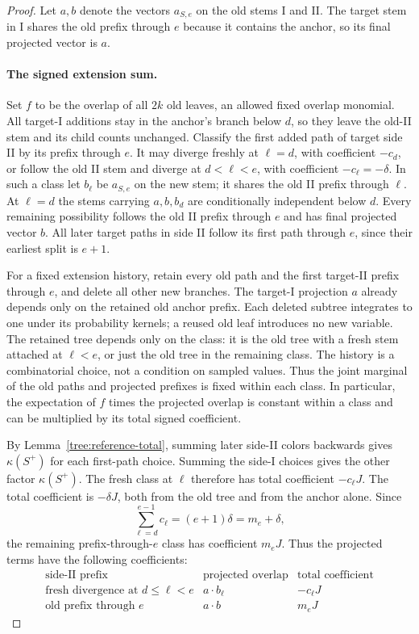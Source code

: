 \begin{proof}
Let $a,b$ denote the vectors $a_{S,e}$ on the old stems I and II.
The target stem in I shares the old prefix through $e$ because it
contains the anchor, so its final projected vector is $a$.

\paragraph{The signed extension sum.}
Set $f$ to be the overlap of all $2k$ old leaves, an allowed fixed
overlap monomial. All target-I additions stay in the anchor's branch
below $d$, so they leave the old-II stem and its child counts unchanged.
Classify the first added path of target side II by its prefix
through $e$.  It may diverge freshly at $\ell=d$, with coefficient
$-c_d$, or follow the old II stem and diverge at $d<\ell<e$, with
coefficient $-c_\ell=-\delta$.  In such a class let $b_\ell$ be
$a_{S,e}$ on the new stem; it shares the old II prefix through
$\ell$.  At $\ell=d$ the stems carrying $a,b,b_d$ are conditionally
independent below $d$.  Every remaining possibility follows the
old II prefix through $e$ and has final projected vector $b$.
All later target paths in side II follow its first path through
$e$, since their earliest split is $e+1$.

For a fixed extension history, retain every old path and the first
target-II prefix through $e$, and delete all other new branches.
The target-I projection $a$ already depends only on the retained old
anchor prefix. Each deleted subtree integrates to one under its
probability kernels; a reused old leaf introduces no new variable.
The retained tree depends only on the class: it is the old tree with a
fresh stem attached at $\ell<e$, or just the old tree in the remaining
class. The history is a combinatorial choice, not a condition on sampled
values. Thus the joint marginal of the old paths and projected prefixes
is fixed within each class. In particular, the expectation of $f$ times
the projected overlap is constant within a class and can be multiplied
by its total signed coefficient.

By Lemma~\ref{tree:reference-total}, summing later side-II colors
backwards gives $\kappa(S^+)$ for each first-path choice.  Summing the
side-I choices gives the other factor $\kappa(S^+)$. The fresh class
at $\ell$ therefore has total coefficient $-c_\ell J$.
The total coefficient is $-\delta J$, both from the old tree and
from the anchor alone. Since
\[
 \sum_{\ell=d}^{e-1}c_\ell=(e+1)\delta=m_e+\delta,
\]
the remaining prefix-through-$e$ class has coefficient $m_eJ$.
Thus the projected terms have the following coefficients:
\[
 \begin{array}{c|c|c}
 \text{side-II prefix} & \text{projected overlap}
      & \text{total coefficient}\\ \hline
 \text{fresh divergence at }d\le\ell<e & a\cdot b_\ell & -c_\ell J\\
 \text{old prefix through }e & a\cdot b & m_eJ
 \end{array}
\]


\end{proof}
